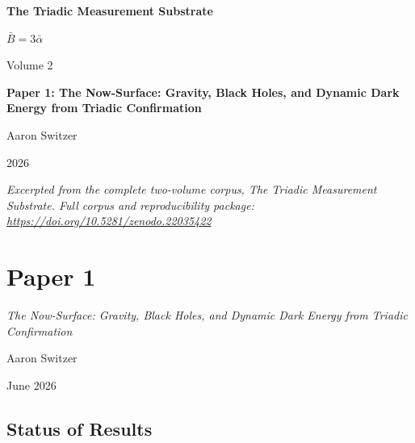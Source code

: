 \documentclass[11pt,oneside]{report}
\theoremstyle{definition}
\theoremstyle{remark}
\begin{document}
\thispagestyle{empty}
\begin{titlepage}
\centering
\vspace*{2cm}
{\sffamily\bfseries\Large The Triadic Measurement Substrate\par}
\vspace{0.6cm}
{\large $\bar{B} = 3\bar{\alpha}$\par}
\vspace{1cm}
{\sffamily\large Volume 2\par}
\vspace{1.4cm}
{\Large \bfseries Paper 1: The Now-Surface: Gravity, Black Holes, and Dynamic Dark Energy from Triadic Confirmation\par}
\vfill
{\large Aaron Switzer\par}
\vspace{0.4cm}
{\large 2026\par}
\vspace{1.2cm}
{\small\itshape Excerpted from the complete two-volume corpus, \emph{The Triadic Measurement Substrate}. Full corpus and reproducibility package: \url{https://doi.org/10.5281/zenodo.22035422}\par}
\end{titlepage}
\cleardoublepage
{}

\chapter*{Paper 1}
\begingroup\centering
{\large\itshape The Now-Surface: Gravity, Black Holes, and Dynamic Dark Energy from Triadic Confirmation\par}\vspace{0.8em}
{\normalsize Aaron Switzer\par}
{\small June 2026\par}
\endgroup\vspace{1.0em}

\par\vspace{0.6em}

\section*{Status of Results}
\end{document}
